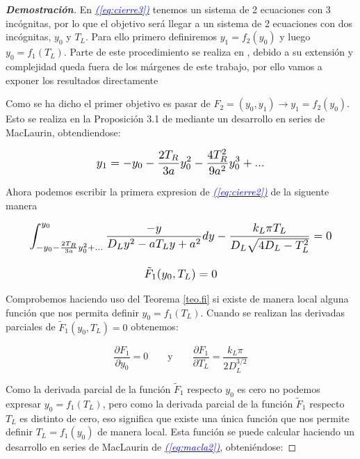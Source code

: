\documentclass[12pt,a4paper]{report} %
\newcommand{\eref}[1]{\hyperref[#1]{\textcolor{blue}{\textit{(\ref*{#1})}}}}
\begin{document}
\begin{proof}[\textbf{Demostración}]
	\vspace{0.5cm}\noindent En \eref{eq:cierre3} tenemos un sistema de 2 ecuaciones con 3 incógnitas, por lo que el objetivo será llegar a un sistema de 2 ecuaciones con dos incógnitas, $y_0$ y $T_L$. Para ello primero definiremos $y_1=f_2(y_0)$ y luego $y_0=f_1(T_L)$. Parte de este procedimiento se realiza en \cite{properties}, debido a su extensión y complejidad queda fuera de los márgenes de este trabajo, por ello vamos a exponer los resultados directamente 
	
	\vspace{0.5cm}Como se ha dicho el primer objetivo es pasar de $F_2=(y_0,y_1) \longrightarrow y_1=f_2(y_0)$. Esto se realiza en la Proposición 3.1 de \cite{properties} mediante un desarrollo en series de MacLaurin, obtendiendose:
	
		\begin{equation}
		\label{eq:macla}
		\scalebox{1.2}{$\displaystyle
			y_1=-y_0-\frac{2T_R}{3a}y_0^2-\frac{4T_R^2}{9a^2}y_0^3+...
			$}
	\end{equation}\smallskip
	
	\vspace{0.5cm}\noindent Ahora podemos escribir la primera expresion de \eref{eq:cierre2} de la siguente manera
	
	\begin{equation}
		\label{eq:macla2}
		\scalebox{1.2}{$\displaystyle
			\begin{gathered}
				\int_{-y_0-\frac{2T_R}{3a}y_0^2+...}^{y_0}\frac{-y}{D_Ly^2-aT_Ly+a^2}dy-\frac{k_L\pi T_L}{D_L\sqrt{4D_L-T_L^2}}=0\\[3mm]
				\tilde{F}_1(y_0,T_L)=0
			\end{gathered}	
			$}
	\end{equation}

	\vspace{0.5cm} Comprobemos haciendo uso del Teorema \ref{teo.fi} si existe de manera local alguna función que nos permita definir $y_0=f_1(T_L)$. Cuando se realizan las derivadas parciales de $\tilde{F}_1(y_0,T_L)=0$ obtenemos:
	
	\begin{equation}
		\label{dpar}
		\frac{\partial F_1}{\partial y_0}=0 \qquad \text{y} \qquad \frac{\partial F_1}{\partial T_L}=\frac{k_L\pi}{2D_L^{3/2}}
	\end{equation}\smallskip
	
	\vspace{0.5cm}\noindent Como la derivada parcial de la función $\tilde{F}_1$ respecto $y_0$ es cero no podemos expresar $y_0=f_1(T_L)$, pero como la derivada parcial de la función $\tilde{F}_1$ respecto $T_L$ es distinto de cero, eso significa que existe una única función que nos permite definir $T_L=f_1(y_0)$ de manera local. Esta función se puede calcular haciendo un desarrollo en series de MacLaurin de \eref{eq:macla2}, obteniéndose:
	

\end{proof}
\end{document}
